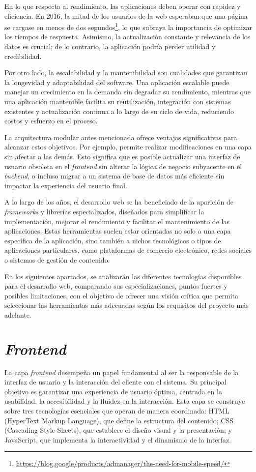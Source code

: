 En lo que respecta al rendimiento, las aplicaciones deben operar con rapidez y eficiencia. En 2016, la mitad de los usuarios de la web esperaban que una página se cargase en menos de dos segundos\footnote{\url{https://blog.google/products/admanager/the-need-for-mobile-speed/}}, lo que subraya la importancia de optimizar los tiempos de respuesta. Asimismo, la actualización constante y relevancia de los datos es crucial; de lo contrario, la aplicación podría perder utilidad y credibilidad.

Por otro lado, la escalabilidad y la mantenibilidad son cualidades que garantizan la longevidad y adaptabilidad del software. Una aplicación escalable puede manejar un crecimiento en la demanda sin degradar su rendimiento, mientras que una aplicación mantenible facilita su reutilización, integración con sistemas existentes y actualización continua a lo largo de su ciclo de vida, reduciendo costos y esfuerzo en el proceso.

La arquitectura modular antes mencionada ofrece ventajas significativas para alcanzar estos objetivos. Por ejemplo, permite realizar modificaciones en una capa sin afectar a las demás. Esto significa que es posible actualizar una interfaz de usuario obsoleta en el \textit{frontend} sin alterar la lógica de negocio subyacente en el \textit{backend}, o incluso migrar a un sistema de base de datos más eficiente sin impactar la experiencia del usuario final.

A lo largo de los años, el desarrollo web se ha beneficiado de la aparición de \textit{frameworks} y librerías especializados, diseñados para simplificar la implementación, mejorar el rendimiento y facilitar el mantenimiento de las aplicaciones. Estas herramientas suelen estar orientadas no solo a una capa específica de la aplicación, sino también a nichos tecnológicos o tipos de aplicaciones particulares, como plataformas de comercio electrónico, redes sociales o sistemas de gestión de contenido.

En los siguientes apartados, se analizarán las diferentes tecnologías disponibles para el desarrollo web, comparando sus especializaciones, puntos fuertes y posibles limitaciones, con el objetivo de ofrecer una visión crítica que permita seleccionar las herramientas más adecuadas según los requisitos del proyecto más adelante.


\section{\textit{Frontend}}
La capa \textit{frontend} desempeña un papel fundamental al ser la responsable de la interfaz de usuario y la interacción del cliente con el sistema. Su principal objetivo es garantizar una experiencia de usuario óptima, centrada en la usabilidad, la accesibilidad y la fluidez en la interacción. Esta capa se construye sobre tres tecnologías esenciales que operan de manera coordinada: HTML (HyperText Markup Language), que define la estructura del contenido; CSS (Cascading Style Sheets), que establece el diseño visual y la presentación; y JavaScript, que implementa la interactividad y el dinamismo de la interfaz.

